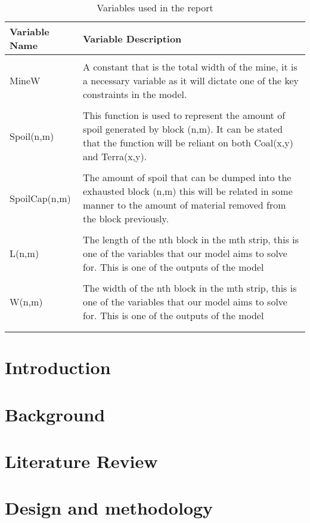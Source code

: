 \documentclass[12pt, openany, a4paper]{book}
\begin{document}
\begin{table}[h!]
	\centering
	\caption{Variables used in the report}
	\begin{tabular}{p{5cm} p{11cm}}
		\textbf{Variable Name} & \textbf{Variable Description}\\ \hline  \\ 
		MineW & A constant that is the total width of the mine, it is a necessary variable as it will dictate one of the key constraints in the model.\\ \hline \\ Spoil(n,m) & This function is used to represent the amount of spoil generated by block (n,m). It can be stated that the function will be reliant on both Coal(x,y) and Terra(x,y). \\ \hline \\
		SpoilCap(n,m) & The amount of spoil that can be dumped into the exhausted block (n,m) this will be related in some manner to the amount of material removed from the block previously.
		\\
		\hline \\
		L(n,m) & The length of the nth block in the mth strip, this is one of the variables that our model aims to solve for. This is one of the outputs of the model \\ \hline \\ 
		W(n,m) & The width of the nth block in the mth strip, this is one of the variables that our model aims to solve for. This is one of the outputs of the model \\ \hline \\ 
		\label{tab:var}
	\end{tabular}	
\end{table}
\newpage
\chapter{Introduction}


\chapter{Background}


\chapter{Literature Review}


\chapter{Design and methodology}

\end{document}

